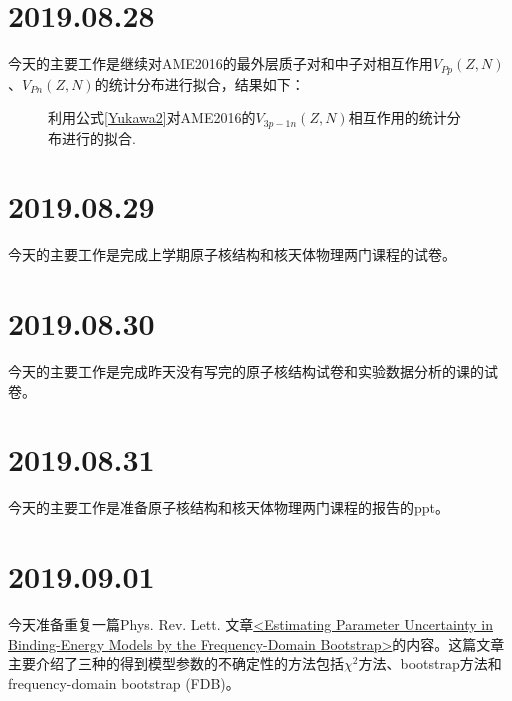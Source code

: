 \section{2019.08.28}
今天的主要工作是继续对AME2016的最外层质子对和中子对相互作用$V_{Pp}(Z,N)$、$V_{Pn}(Z,N)$的统计分布进行拟合，结果如下：
\begin{figure}[H]
\centering
{}
\qquad
{}
\caption{利用公式\ref{Yukawa2}对AME2016的$V_{3p-1n}(Z,N)$相互作用的统计分布进行的拟合.\label{fig_YE3FitV1p3n_1}}
\end{figure}
\section{2019.08.29}
今天的主要工作是完成上学期原子核结构和核天体物理两门课程的试卷。
\section{2019.08.30}
今天的主要工作是完成昨天没有写完的原子核结构试卷和实验数据分析的课的试卷。
\section{2019.08.31}
今天的主要工作是准备原子核结构和核天体物理两门课程的报告的ppt。
\section{2019.09.01}
今天准备重复一篇Phys. Rev. Lett. 文章\href{https://journals.aps.org/prl/abstract/10.1103/PhysRevLett.119.252501}{<Estimating Parameter Uncertainty in Binding-Energy Models by the Frequency-Domain Bootstrap>}的内容。这篇文章主要介绍了三种的得到模型参数的不确定性的方法包括$\chi^2$方法、bootstrap方法和frequency-domain bootstrap (FDB)。

